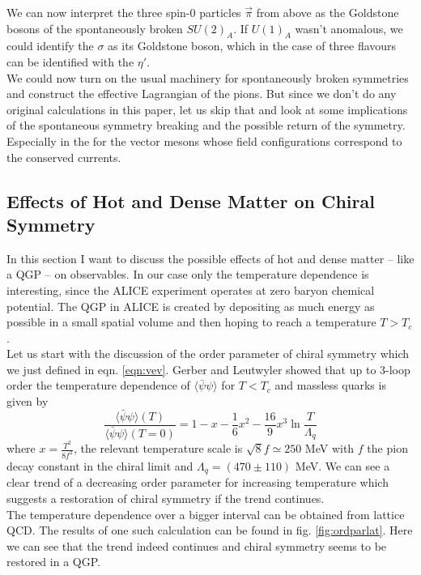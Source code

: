 We can now interpret the three spin-0 particles $\vec{\pi}$ from above as the Goldstone bosons of the spontaneously broken $SU(2)_A$. If $U(1)_A$ wasn't anomalous, we could identify the $\sigma$ as its Goldstone boson, which in the case of three flavours can be identified with the $\eta'$. \\
We could now turn on the usual machinery for spontaneously broken symmetries and construct the effective Lagrangian of the pions. But since we don't do any original calculations in this paper, let us skip that and look at some implications of the spontaneous symmetry breaking and the possible return of the symmetry. Especially in the for the vector mesons whose field configurations correspond to the conserved currents.

\subsection{Effects of Hot and Dense Matter on Chiral Symmetry}
In this section I want to discuss the possible effects of hot and dense matter -- like a QGP -- on observables. In our case only the temperature dependence is interesting, since the ALICE experiment operates at zero baryon chemical potential. The QGP in ALICE is created by depositing as much energy as possible in a small spatial volume and then hoping to reach a temperature $T > T_c$. \\
Let us start with the discussion of the order parameter of chiral symmetry which we just defined in eqn. \ref{eqn:vev}. Gerber and Leutwyler showed that up to 3-loop order the temperature dependence of $\langle \bar{\psi} \psi \rangle$ for $T < T_c$ and massless quarks is given by \cite{OrdPar3loop}
\begin{equation}
\label{eqn:vevT}
\frac{\langle \bar{\psi} \psi \rangle(T)}{\langle \bar{\psi} \psi \rangle(T=0)} = 1 - x - \frac{1}{6} x^2 - \frac{16}{9} x^3 \ln \frac{T}{\Lambda_q}
\end{equation}
where $x = \frac{T^2}{8f^2}$, the relevant temperature scale is $\sqrt{8}f \simeq 250$ MeV with $f$ the pion decay constant in the chiral limit and $\Lambda_q = (470 \pm 110)$ MeV. We can see a clear trend of a decreasing order parameter for increasing temperature which suggests a restoration of chiral symmetry if the trend continues. \\
The temperature dependence over a bigger interval can be obtained from lattice QCD. The results of one such calculation can be found in fig. \ref{fig:ordparlat}. Here we can see that the trend indeed continues and chiral symmetry seems to be restored in a QGP.
